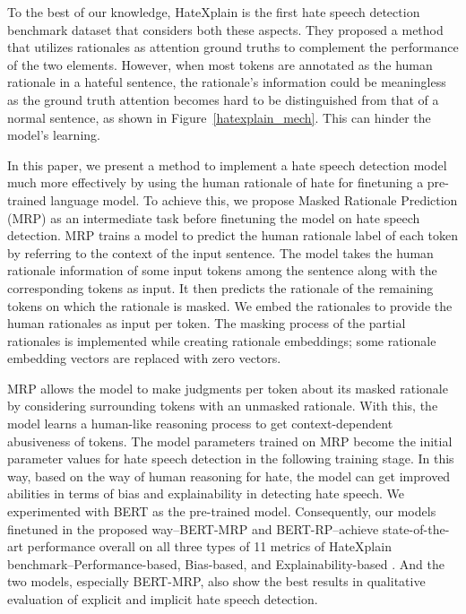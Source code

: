 \documentclass[11pt]{article}
\begin{document}
To the best of our knowledge, HateXplain \citep{mathew2020hatexplain} is the first hate speech detection benchmark dataset that considers both these aspects. They proposed a method that utilizes rationales as attention ground truths to complement the performance of the two elements. 
However, when most tokens are annotated as the human rationale in a hateful sentence, the rationale's information could be meaningless as the ground truth attention becomes hard to be distinguished from that of a normal sentence, as shown in Figure~\ref{hatexplain_mech}. This can hinder the model's learning. 




In this paper, we present a method to implement a hate speech detection model much more effectively by using the human rationale of hate for finetuning a pre-trained language model. To achieve this, we propose Masked Rationale Prediction (MRP) as an intermediate task before finetuning the model on hate speech detection. MRP trains a model to predict the human rationale label of each token by referring to the context of the input sentence. The model takes the human rationale information of some input tokens among the sentence along with the corresponding tokens as input. It then predicts the rationale of the remaining tokens on which the rationale is masked. We embed the rationales to provide the human rationales as input per token. The masking process of the partial rationales is implemented while creating rationale embeddings; some rationale embedding vectors are replaced with zero vectors. 


MRP allows the model to make judgments per token about its masked rationale by considering surrounding tokens with an unmasked rationale. With this, the model learns a human-like reasoning process to get context-dependent abusiveness of tokens. The model parameters trained on MRP become the initial parameter values for hate speech detection in the following training stage. In this way, based on the way of human reasoning for hate, the model can get improved abilities in terms of bias and explainability in detecting hate speech. We experimented with BERT \cite{devlin2018bert} as the pre-trained model. Consequently, our models finetuned in the proposed way--BERT-MRP and BERT-RP--achieve state-of-the-art performance overall on all three types of 11 metrics of HateXplain benchmark--Performance-based, Bias-based, and Explainability-based \citep{mathew2020hatexplain}. And the two models, especially BERT-MRP, also show the best results in qualitative evaluation of explicit and implicit hate speech detection. 
\end{document}
